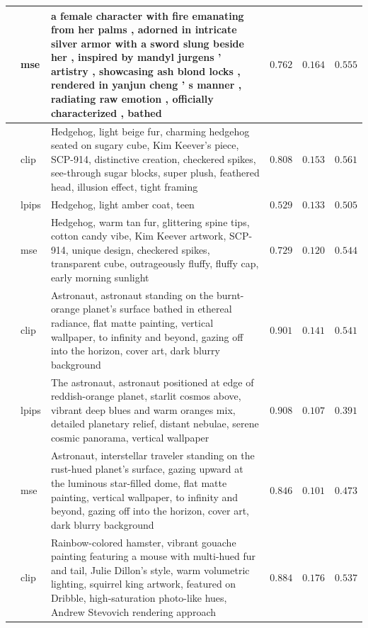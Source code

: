 \documentclass[runningheads]{llncs}
\begin{document}
\begin{table}[t]
\begin{tabular}{p{1.5cm} l p{5.6cm} c c c}
 & mse & a female character with fire emanating from her palms , adorned in intricate silver armor with a sword slung beside her , inspired by mandyl jurgens ' artistry , showcasing ash blond locks , rendered in yanjun cheng ' s manner , radiating raw emotion , officially characterized , bathed & $0.762$ & $0.164$ & $0.555$ \\
\midrule
{} & clip & Hedgehog, light beige fur, charming hedgehog seated on sugary cube, Kim Keever's piece, SCP-914, distinctive creation, checkered spikes, see-through sugar blocks, super plush, feathered head, illusion effect, tight framing & $0.808$ & $0.153$ & $0.561$ \\
 & lpips & Hedgehog, light amber coat, teen & $0.529$ & $0.133$ & $0.505$ \\
 & mse & Hedgehog, warm tan fur, glittering spine tips, cotton candy vibe, Kim Keever artwork, SCP-914, unique design, checkered spikes, transparent cube, outrageously fluffy, fluffy cap, early morning sunlight & $0.729$ & $0.120$ & $0.544$ \\
\midrule
{} & clip & Astronaut, astronaut standing on the burnt-orange planet's surface bathed in ethereal radiance, flat matte painting, vertical wallpaper, to infinity and beyond, gazing off into the horizon, cover art, dark blurry background & $0.901$ & $0.141$ & $0.541$ \\
 & lpips & The astronaut, astronaut positioned at edge of reddish-orange planet, starlit cosmos above, vibrant deep blues and warm oranges mix, detailed planetary relief, distant nebulae, serene cosmic panorama, vertical wallpaper & $0.908$ & $0.107$ & $0.391$ \\
 & mse & Astronaut, interstellar traveler standing on the rust-hued planet's surface, gazing upward at the luminous star-filled dome, flat matte painting, vertical wallpaper, to infinity and beyond, gazing off into the horizon, cover art, dark blurry background & $0.846$ & $0.101$ & $0.473$ \\
\midrule
{} & clip & Rainbow-colored hamster, vibrant gouache painting featuring a mouse with multi-hued fur and tail, Julie Dillon's style, warm volumetric lighting, squirrel king artwork, featured on Dribble, high-saturation photo-like hues, Andrew Stevovich rendering approach & $0.884$ & $0.176$ & $0.537$ \\

\end{tabular}
\end{table}
\end{document}
